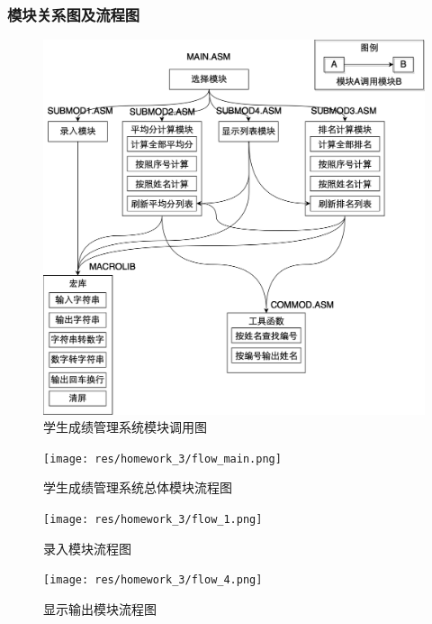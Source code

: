 \documentclass{article}
\begin{document}
	\subsubsection{模块关系图及流程图}
	\begin{figure}[H]
		\centering
		\includegraphics[width=1.0\linewidth]{res/homework_3/module.png}
		\caption{学生成绩管理系统模块调用图}
		\label{fig:module}
	\end{figure}

	\begin{figure}[H]
		\centering
		\texttt{[image: res/homework\_3/flow\_main.png]}
		\caption{学生成绩管理系统总体模块流程图}
		\label{fig:flowm}
	\end{figure}

	\begin{multicols}{2}
		\begin{figure}[H]
			\centering
			\texttt{[image: res/homework\_3/flow\_1.png]}
			\caption{录入模块流程图}
			\label{fig:flow1}
		\end{figure}

		\begin{figure}[H]
			\centering
			\texttt{[image: res/homework\_3/flow\_4.png]}
			\caption{显示输出模块流程图}
			\label{fig:flow4}
		\end{figure}
	\end{multicols}
\end{document}
